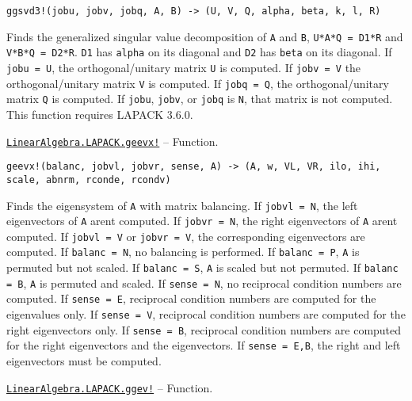 \begin{adjustwidth}{2em}{0pt}


\begin{verbatim}
ggsvd3!(jobu, jobv, jobq, A, B) -> (U, V, Q, alpha, beta, k, l, R)
\end{verbatim}

Finds the generalized singular value decomposition of \texttt{A} and \texttt{B}, \texttt{U{\textquotesingle}*A*Q = D1*R} and \texttt{V{\textquotesingle}*B*Q = D2*R}. \texttt{D1} has \texttt{alpha} on its diagonal and \texttt{D2} has \texttt{beta} on its diagonal. If \texttt{jobu = U}, the orthogonal/unitary matrix \texttt{U} is computed. If \texttt{jobv = V} the orthogonal/unitary matrix \texttt{V} is computed. If \texttt{jobq = Q}, the orthogonal/unitary matrix \texttt{Q} is computed. If \texttt{jobu}, \texttt{jobv}, or \texttt{jobq} is \texttt{N}, that matrix is not computed. This function requires LAPACK 3.6.0.



\end{adjustwidth}
\hypertarget{13160568642977439323}{} 
\hyperlink{13160568642977439323}{\texttt{LinearAlgebra.LAPACK.geevx!}}  -- {Function.}

\begin{adjustwidth}{2em}{0pt}


\begin{verbatim}
geevx!(balanc, jobvl, jobvr, sense, A) -> (A, w, VL, VR, ilo, ihi, scale, abnrm, rconde, rcondv)
\end{verbatim}

Finds the eigensystem of \texttt{A} with matrix balancing. If \texttt{jobvl = N}, the left eigenvectors of \texttt{A} aren{\textquotesingle}t computed. If \texttt{jobvr = N}, the right eigenvectors of \texttt{A} aren{\textquotesingle}t computed. If \texttt{jobvl = V} or \texttt{jobvr = V}, the corresponding eigenvectors are computed. If \texttt{balanc = N}, no balancing is performed. If \texttt{balanc = P}, \texttt{A} is permuted but not scaled. If \texttt{balanc = S}, \texttt{A} is scaled but not permuted. If \texttt{balanc = B}, \texttt{A} is permuted and scaled. If \texttt{sense = N}, no reciprocal condition numbers are computed. If \texttt{sense = E}, reciprocal condition numbers are computed for the eigenvalues only. If \texttt{sense = V}, reciprocal condition numbers are computed for the right eigenvectors only. If \texttt{sense = B}, reciprocal condition numbers are computed for the right eigenvectors and the eigenvectors. If \texttt{sense = E,B}, the right and left eigenvectors must be computed.



\end{adjustwidth}
\hypertarget{11158917129247885932}{} 
\hyperlink{11158917129247885932}{\texttt{LinearAlgebra.LAPACK.ggev!}}  -- {Function.}

